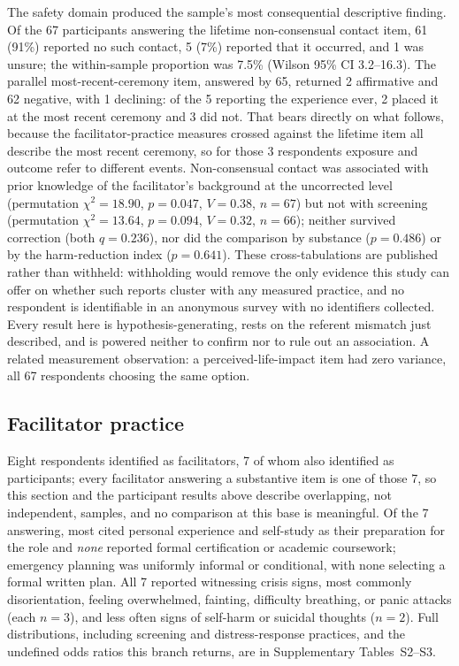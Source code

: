 \documentclass[12pt]{article}
\begin{document}
The safety domain produced the sample's most consequential descriptive finding. Of the 67 participants
answering the lifetime non-consensual contact item, 61 (91\%) reported no such contact, 5 (7\%) reported
that it occurred, and 1 was unsure; the within-sample proportion was 7.5\% (Wilson 95\% CI 3.2--16.3). The
parallel most-recent-ceremony item, answered by 65, returned 2 affirmative and 62 negative, with 1
declining: of the 5 reporting the experience ever, 2 placed it at the most recent ceremony and 3 did not.
That bears directly on what follows, because the facilitator-practice measures crossed against the lifetime
item all describe the most recent ceremony, so for those 3 respondents exposure and outcome refer to
different events. Non-consensual contact was associated with prior knowledge of the facilitator's
background at the uncorrected level (permutation $\chi^2 = 18.90$, $p=0.047$, $V=0.38$, $n=67$) but not
with screening (permutation $\chi^2 = 13.64$, $p=0.094$, $V=0.32$, $n=66$); neither survived correction
(both $q=0.236$), nor did the comparison by substance ($p=0.486$) or by the harm-reduction index
($p=0.641$). These cross-tabulations are published rather than withheld: withholding would remove the only evidence this
study can offer on whether such reports cluster with any measured practice, and no respondent is
identifiable in an anonymous survey with no identifiers collected. Every result here is hypothesis-generating, rests on the referent mismatch just
described, and is powered neither to confirm nor to rule out an association. A related measurement
observation: a perceived-life-impact item had zero variance, all 67 respondents choosing the same option.

\subsection{Facilitator practice}

Eight respondents identified as facilitators, 7 of whom also identified as participants; every facilitator
answering a substantive item is one of those 7, so this section and the participant results above describe
overlapping, not independent, samples, and no comparison at this base is meaningful. Of the 7 answering, most cited personal experience and self-study as their preparation for the role and
\emph{none} reported formal certification or academic coursework; emergency planning was uniformly informal
or conditional, with none selecting a formal written plan. All 7 reported witnessing crisis signs, most
commonly disorientation, feeling overwhelmed, fainting, difficulty breathing, or panic attacks (each $n=3$),
and less often signs of self-harm or suicidal thoughts ($n=2$). Full distributions, including screening and
distress-response practices, and the undefined odds ratios this branch returns, are in Supplementary
Tables~S2--S3.
\end{document}
